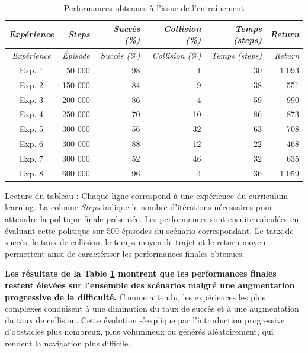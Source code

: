 \begin{longtable}{crrrrr}

\caption{Performances obtenues à l'issue de l'entraînement} \label{tab:training_perf} \\
\toprule
\textit{Expérience} & \textit{Steps} & \textit{Succès (\%)} & \textit{Collision (\%)} & \textit{Temps (steps)} & \textit{Return} \\
\midrule
\endfirsthead
\toprule
\textit{Expérience} & \textit{Épisode} & \textit{Succès (\%)} & \textit{Collision (\%)} & \textit{Temps (steps)} & \textit{Return} \\
\midrule
\endhead
\midrule
\endfoot
\bottomrule
\endlastfoot

Exp. 1 & 50 000 & 98 & 1 & 30 & 1 093 \\
\midrule
Exp. 2 & 150 000 & 84 & 9 & 38 & 551 \\
\midrule
Exp. 3 & 200 000 & 86 & 4 & 59 & 990 \\
\midrule
Exp. 4 & 250 000 & 70 & 10 & 86 & 873 \\
\midrule
Exp. 5 & 300 000 & 56 & 32 & 63 & 708 \\
\midrule
Exp. 6 & 300 000 & 88 & 12 & 22 & 468 \\
\midrule
Exp. 7 & 300 000 & 52 & 46 & 32 & 635 \\
\midrule
Exp. 8 & 600 000 & 96 & 4 & 36 & 1 059 \\

\end{longtable}
\vspace{-10pt}
{
\footnotesize
\color{darkgray}
\noindent Lecture du tableau : Chaque ligne correspond à une expérience du curriculum learning. La colonne \textit{Steps} indique le nombre d'itérations nécessaires pour atteindre la politique finale présentée. Les performances sont ensuite calculées en évaluant cette politique sur 500 épisodes du scénario correspondant. Le taux de succès, le taux de collision, le temps moyen de trajet et le return moyen permettent ainsi de caractériser les performances finales obtenues.
}

\vspace{10pt}

\noindent \textbf{Les résultats de la Table \ref{tab:training_perf} montrent que les performances finales restent élevées sur l'ensemble des scénarios malgré une augmentation progressive de la difficulté.} Comme attendu, les expériences les plus complexes conduisent à une diminution du taux de succès et à une augmentation du taux de collision. Cette évolution s'explique par l'introduction progressive d'obstacles plus nombreux, plus volumineux ou générés aléatoirement, qui rendent la navigation plus difficile.

